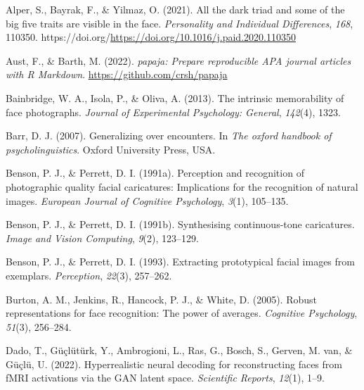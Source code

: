 \documentclass[
  doc,floatsintext]{apa6}
\newlength{\cslhangindent}
\newlength{\cslentryspacingunit} %
\newenvironment{CSLReferences}[2] %
 {%
  \setlength{\parindent}{0pt}
  \ifodd #1
  \let\oldpar\par
  \def\par{\hangindent=\cslhangindent\oldpar}
  \fi
  \setlength{\parskip}{#2\cslentryspacingunit}
 }%
 {}
\begin{document}
\hypertarget{refs}{}
\begin{CSLReferences}{1}{0}
\leavevmode{}%
Alper, S., Bayrak, F., \& Yilmaz, O. (2021). All the dark triad and some of the big five traits are visible in the face. \emph{Personality and Individual Differences}, \emph{168}, 110350. https://doi.org/\url{https://doi.org/10.1016/j.paid.2020.110350}

\leavevmode{}%
Aust, F., \& Barth, M. (2022). \emph{{papaja}: {Prepare} reproducible {APA} journal articles with {R Markdown}}. \url{https://github.com/crsh/papaja}

\leavevmode{}%
Bainbridge, W. A., Isola, P., \& Oliva, A. (2013). The intrinsic memorability of face photographs. \emph{Journal of Experimental Psychology: General}, \emph{142}(4), 1323.

\leavevmode{}%
Barr, D. J. (2007). Generalizing over encounters. In \emph{The oxford handbook of psycholinguistics}. Oxford University Press, USA.

\leavevmode{}%
Benson, P. J., \& Perrett, D. I. (1991a). Perception and recognition of photographic quality facial caricatures: Implications for the recognition of natural images. \emph{European Journal of Cognitive Psychology}, \emph{3}(1), 105--135.

\leavevmode{}%
Benson, P. J., \& Perrett, D. I. (1991b). Synthesising continuous-tone caricatures. \emph{Image and Vision Computing}, \emph{9}(2), 123--129.

\leavevmode{}%
Benson, P. J., \& Perrett, D. I. (1993). Extracting prototypical facial images from exemplars. \emph{Perception}, \emph{22}(3), 257--262.

\leavevmode{}%
Burton, A. M., Jenkins, R., Hancock, P. J., \& White, D. (2005). Robust representations for face recognition: The power of averages. \emph{Cognitive Psychology}, \emph{51}(3), 256--284.

\leavevmode{}%
Dado, T., Güçlütürk, Y., Ambrogioni, L., Ras, G., Bosch, S., Gerven, M. van, \& Güçlü, U. (2022). Hyperrealistic neural decoding for reconstructing faces from fMRI activations via the GAN latent space. \emph{Scientific Reports}, \emph{12}(1), 1--9.


\end{CSLReferences}
\end{document}
